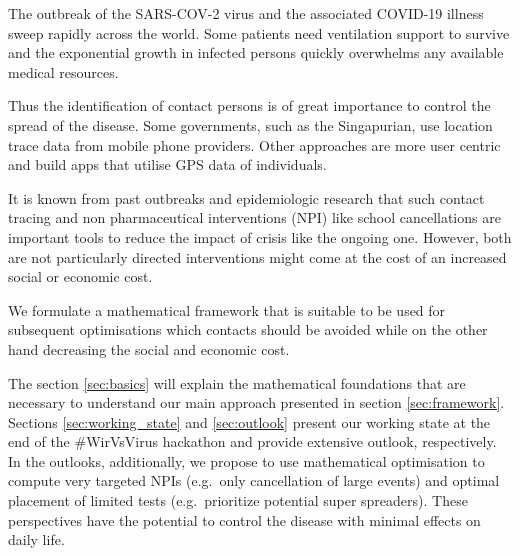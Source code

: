 The outbreak of the SARS-COV-2 virus and the associated COVID-19 illness sweep rapidly across the world. Some patients need ventilation support to survive and the exponential growth in infected persons quickly overwhelms any available medical resources.

Thus the identification of contact persons is of great importance to control the spread of the disease. Some governments, such as the Singapurian, use location trace data from mobile phone providers. Other approaches are more user centric and build apps that utilise GPS data of individuals.

It is known from past outbreaks and epidemiologic research that such contact tracing and non pharmaceutical interventions (NPI) like school cancellations are important tools to reduce the impact of crisis like the ongoing one. However, both are not particularly directed interventions might come at the cost of an increased social or economic cost.

We formulate a mathematical framework that is suitable to be used for subsequent optimisations which contacts should be avoided while on the other hand decreasing the social and economic cost.

The section \ref{sec:basics} will explain the mathematical foundations that are necessary to understand our main approach presented in section \ref{sec:framework}. Sections \ref{sec:working_state} and \ref{sec:outlook} present our working state at the end of the \#WirVsVirus hackathon and provide extensive outlook, respectively. In the outlooks, additionally, we propose to use mathematical optimisation to compute very targeted NPIs (e.g.\ only cancellation of large events) and optimal placement of limited tests (e.g.\ prioritize potential super spreaders). These perspectives have the potential to control the disease with minimal effects on daily life.